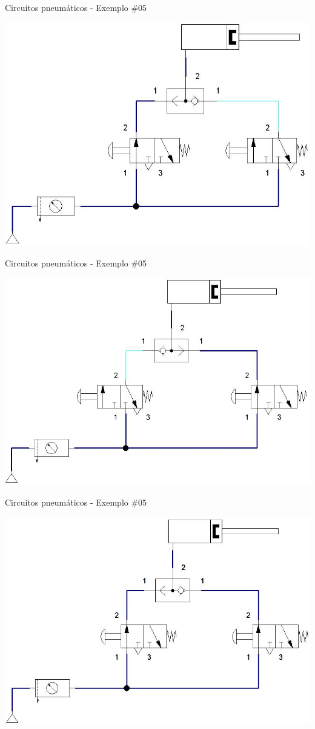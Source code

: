 \begin{frame}{Circuitos pneumáticos - Exemplo \#05}
	
	\centering
	\includegraphics[width=0.8\linewidth]{Figuras/Ch14/fig48n22}
	
\end{frame}


\begin{frame}{Circuitos pneumáticos - Exemplo \#05}
	
	\centering
	\includegraphics[width=0.8\linewidth]{Figuras/Ch14/fig48n23}
	
\end{frame}


\begin{frame}{Circuitos pneumáticos - Exemplo \#05}
	
	\centering
	\includegraphics[width=0.8\linewidth]{Figuras/Ch14/fig48n24}
	
\end{frame}


